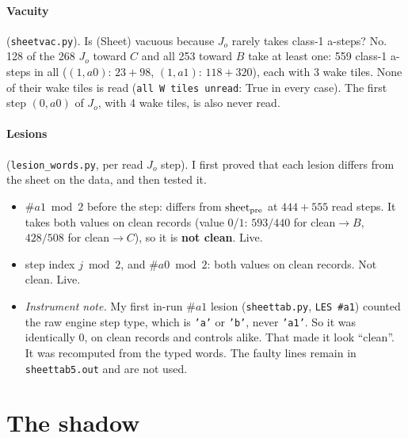 \documentclass[11pt]{article}
\theoremstyle{definition}\newtheorem{definition}[theorem]{Definition}\newtheorem{remark}[theorem]{Remark}
\begin{document}
\paragraph{Vacuity} (\texttt{sheetvac.py}). Is (Sheet) vacuous because $J_o$ rarely takes class-1 a-steps? No. 128 of the 268 $J_o$ toward $C$ and all 253 toward $B$ take at least one: 559 class-1 a-steps in all ($(1,a0)$: $23+98$, $(1,a1)$: $118+320$), each with 3 wake tiles. None of their wake tiles is read (\texttt{all W tiles unread}: True in every case). The first step $(0,a0)$ of $J_o$, with 4 wake tiles, is also never read.
\paragraph{Lesions} (\texttt{lesion\_words.py}, per read $J_o$ step). I first proved that each lesion differs from the sheet on the data, and then tested it.
\begin{itemize}
\item $\#a1\bmod2$ before the step: differs from $\mathrm{sheet}_{\rm pre}$ at $444+555$ read steps. It takes both values on clean records (value $0$/$1$: $593/440$ for clean$\to B$, $428/508$ for clean$\to C$), so it is \textbf{not clean}. Live.
\item step index $j\bmod2$, and $\#a0\bmod2$: both values on clean records. Not clean. Live.
\item \emph{Instrument note.} My first in-run $\#a1$ lesion (\texttt{sheettab.py}, \texttt{LES \#a1}) counted the raw engine step type, which is \texttt{'a'} or \texttt{'b'}, never \texttt{'a1'}. So it was identically $0$, on clean records and controls alike. That made it look ``clean''. It was recomputed from the typed words. The faulty lines remain in \texttt{sheettab5.out} and are not used.
\end{itemize}

\section{The shadow}\label{sec:shadow}
\end{document}
